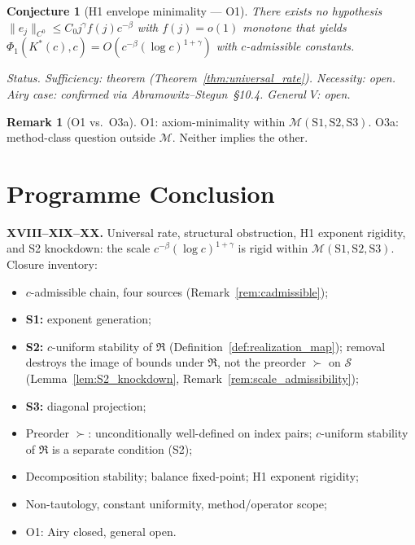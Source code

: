 \documentclass[12pt,a4paper]{amsart}
\newtheorem{conjecture}[theorem]{Conjecture}
\theoremstyle{definition}
\newtheorem{remark}[theorem]{Remark}
\begin{document}
\begin{conjecture}[H1 envelope minimality --- O1]
\label{conj:H1_envelope}
There exists no hypothesis
$\|e_j\|_{C^0} \leq C_0 j^\gamma f(j) c^{-\beta}$
with $f(j)=o(1)$ monotone that yields
$\Phi_1(K^*(c),c) = O(c^{-\beta}(\log c)^{1+\gamma})$
with $c$-admissible constants.

\emph{Status.}
Sufficiency: theorem (Theorem~\ref{thm:universal_rate}).
Necessity: open.
Airy case: confirmed via Abramowitz--Stegun~\S10.4.
General $V$: open.
\end{conjecture}

\begin{remark}[O1 vs.\ O3a]
\label{rem:O1_vs_O3a}
O1: axiom-minimality within $\mathcal{M}(\mathrm{S1,S2,S3})$.
O3a: method-class question outside $\mathcal{M}$.
Neither implies the other.
\end{remark}

\section{Programme Conclusion}
\label{sec:conclusion}

\textbf{XVIII--XIX--XX.}
Universal rate, structural obstruction, H1 exponent rigidity,
and S2 knockdown: the scale $c^{-\beta}(\log c)^{1+\gamma}$
is rigid within $\mathcal{M}(\mathrm{S1,S2,S3})$.
Closure inventory:
\begin{itemize}[nosep,leftmargin=1.5em]
  \item $c$-admissible chain, four sources (Remark~\ref{rem:cadmissible});
  \item \textbf{S1:} exponent generation;
  \item \textbf{S2:} $c$-uniform stability of $\mathfrak{R}$
    (Definition~\ref{def:realization_map});
    removal destroys the image of bounds under $\mathfrak{R}$,
    not the preorder $\succ$ on $\mathcal{S}$
    (Lemma~\ref{lem:S2_knockdown}, Remark~\ref{rem:scale_admissibility});
  \item \textbf{S3:} diagonal projection;
  \item Preorder $\succ$: unconditionally well-defined on index pairs;
    $c$-uniform stability of $\mathfrak{R}$ is a separate condition (S2);
  \item Decomposition stability; balance fixed-point;
    H1 exponent rigidity;
  \item Non-tautology, constant uniformity, method/operator scope;
  \item O1: Airy closed, general open.
\end{itemize}
\end{document}
